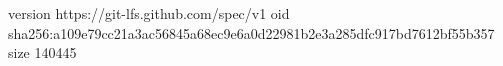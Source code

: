 version https://git-lfs.github.com/spec/v1
oid sha256:a109e79cc21a3ac56845a68ec9e6a0d22981b2e3a285dfc917bd7612bf55b357
size 140445
